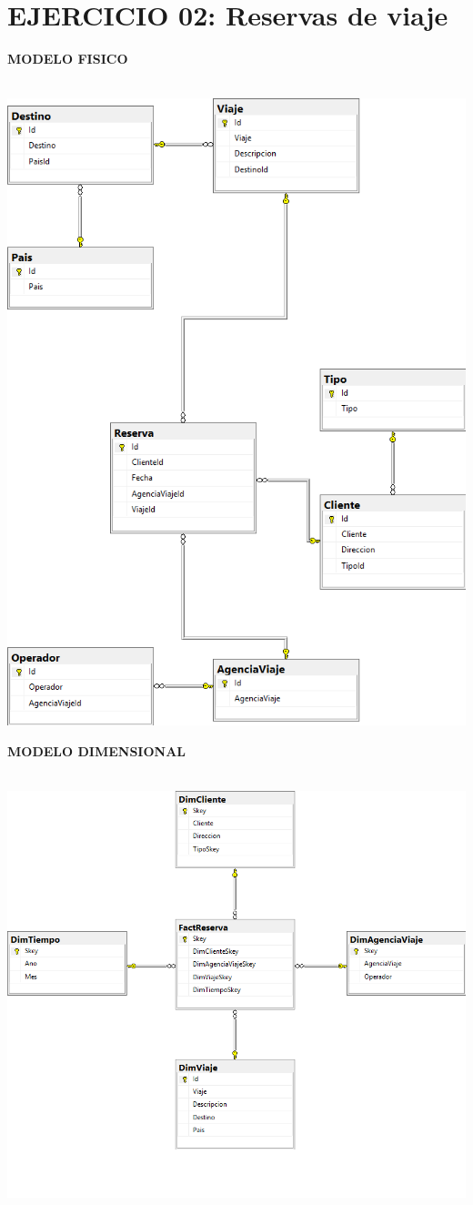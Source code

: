 \section{EJERCICIO 02: Reservas de viaje} 

\textbf{MODELO FISICO}\\\\
\begin{center}
\includegraphics[width=\columnwidth]{images/task2/e2}\newline
\end{center}

\textbf{MODELO DIMENSIONAL}\\\\
\begin{center}
\includegraphics[width=\columnwidth]{images/task2/d2}\newline
\end{center}